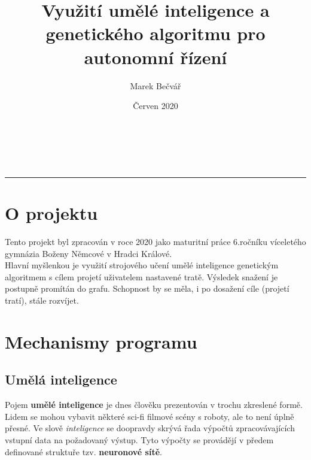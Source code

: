 \documentclass[a4paper,12pt]{article}
\title{Využití umělé inteligence a genetického algoritmu pro autonomní řízení}
\author{Marek Bečvář}
\date{Červen 2020}
\renewcommand{\maketitle}
{
    \begin{center}
        \vspace*{0cm}
        \LARGE{\textbf{\thetitle}}\\
        \vspace{0.5cm}
        \Large{\textbf{\theauthor}}\\
        \vspace{0.5cm}
        \normalsize{\thedate}
        \vspace{0.2cm}
        \hrule
    \end{center}
}
\newcommand{\tab}
{
    \hspace*{1em}
}
\begin{document}
    \maketitle

    \vspace{0.25cm}
    \section{O projektu}
        \tab Tento projekt byl zpracován v roce 2020 jako maturitní práce 6.ročníku 
        víceletého gymnázia Boženy Němcové v Hradci Králové.\\
        \tab Hlavní myšlenkou je využití strojového učení umělé inteligence genetickým 
        algoritmem s cílem projetí uživatelem nastavené tratě. Výsledek snažení 
        je postupně promítán do grafu. Schopnost by se měla, i po dosažení cíle (projetí tratí),
        stále rozvíjet.

    \section{Mechanismy programu}
    \subsection{Umělá inteligence}
        Pojem \textbf{umělé inteligence} je dnes člověku prezentován v trochu zkreslené formě.
        Lidem se mohou vybavit některé sci-fi filmové scény s roboty, ale to není úplně přesné.
        Ve slově \textit{inteligence} se doopravdy skrývá řada výpočtů zpracovávajících vstupní data 
        na požadovaný výstup. Tyto výpočty se provádějí v předem definované 
        struktuře tzv. \textbf{neuronové sítě}.\\
            
\end{document}
